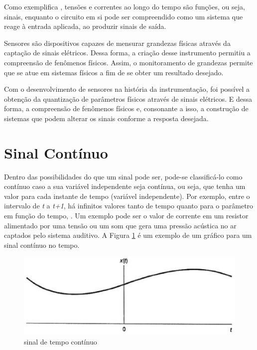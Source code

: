 Como exemplifica \cite{oppenheim2010sinais}, tensões e correntes ao longo do tempo são funções, ou seja, sinais, enquanto o circuito em si pode ser compreendido como um sistema que reage à entrada aplicada, ao produzir sinais de saída.

Sensores são dispositivos capazes de mensurar grandezas físicas através da captação de sinais elétricos. Dessa forma, a criação desse instrumento permitiu a compreensão de fenômenos físicos. Assim, o monitoramento de grandezas permite que se atue em sistemas físicos a fim de se obter um resultado desejado.

Com o desenvolvimento de sensores na história da instrumentação, foi possível a obtenção da quantização de parâmetros físicos através de sinais elétricos. E dessa forma, a compreensão de fenômenos físicos e, consonante a isso, a construção de sistemas que podem alterar os sinais conforme a resposta desejada. 

\section{Sinal Contínuo}
Dentro das possibilidades do que um sinal pode ser, pode-se classificá-lo como contínuo caso a sua variável independente seja contínua, ou seja, que tenha um valor para cada instante de tempo (variável independente). Por exemplo, entre o intervalo de \textit{t} a \textit{t+1}, há infinitos valores tanto de tempo quanto para o parâmetro em função do tempo, \cite{oppenheim2010sinais}. Um exemplo pode ser o valor de corrente em um resistor alimentado por uma tensão ou um som que gera uma pressão acústica no ar captados pelo sistema auditivo. A Figura \ref{fig01} é um exemplo de um gráfico para um sinal contínuo no tempo. 

\begin{figure}[h]
	\centering
	\includegraphics[scale=0.5]{figuras/fig01.eps}
	\caption{sinal de tempo contínuo}
	\label{fig01}
\end{figure}
\newpage

